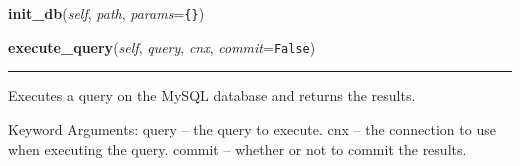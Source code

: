     \label{reliafree:mysql:MySQLInterface:init_db}

    \vspace{0.5ex}

\hspace{.8\funcindent}\begin{boxedminipage}{\funcwidth}

    \raggedright \textbf{init\_db}(\textit{self}, \textit{path}, \textit{params}={\tt \texttt{\{}\texttt{\}}})

\setlength{\parskip}{2ex}
\setlength{\parskip}{1ex}
    \end{boxedminipage}

    \label{reliafree:mysql:MySQLInterface:execute_query}

    \vspace{0.5ex}

\hspace{.8\funcindent}\begin{boxedminipage}{\funcwidth}

    \raggedright \textbf{execute\_query}(\textit{self}, \textit{query}, \textit{cnx}, \textit{commit}={\tt False})

    \vspace{-1.5ex}

    \rule{\textwidth}{0.5\fboxrule}
\setlength{\parskip}{2ex}
    Executes a query on the MySQL database and returns the results.

    Keyword Arguments: query  -- the query to execute. cnx    -- the 
    connection to use when executing the query. commit -- whether or not to
    commit the results.

\setlength{\parskip}{1ex}
    \end{boxedminipage}

